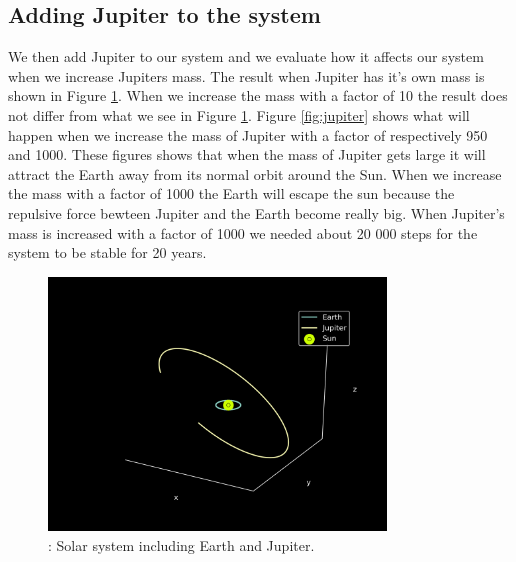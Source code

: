 \documentclass{article}
\begin{document}
\subsection{Adding Jupiter to the system}
We then add Jupiter to our system and we evaluate how it affects our system when we increase Jupiters mass. The result when Jupiter has it's own mass is shown in Figure \ref{fig:jupiter1}. When we increase the mass with a factor of 10 the result does not differ from what we see in Figure \ref{fig:jupiter1}. Figure \ref{fig:jupiter} shows what will happen when we increase the mass of Jupiter with a factor of respectively 950 and 1000. These figures shows that when the mass of Jupiter gets large it will attract the Earth away from its normal orbit around the Sun. When we increase the mass with a factor of 1000 the Earth will escape the sun because the repulsive force bewteen Jupiter and the Earth become really big. When Jupiter's mass is increased with a factor of 1000 we needed about 20 000 steps for the system to be stable for 20 years.

\begin{figure}[H]
    \begin{center}
        \includegraphics[width=0.8\textwidth]{./Plot/Earth_Jupiter1.png}
        \caption{: Solar system including Earth and Jupiter.}
        \label{fig:jupiter1}
    \end{center}
\end{figure}
\end{document}
